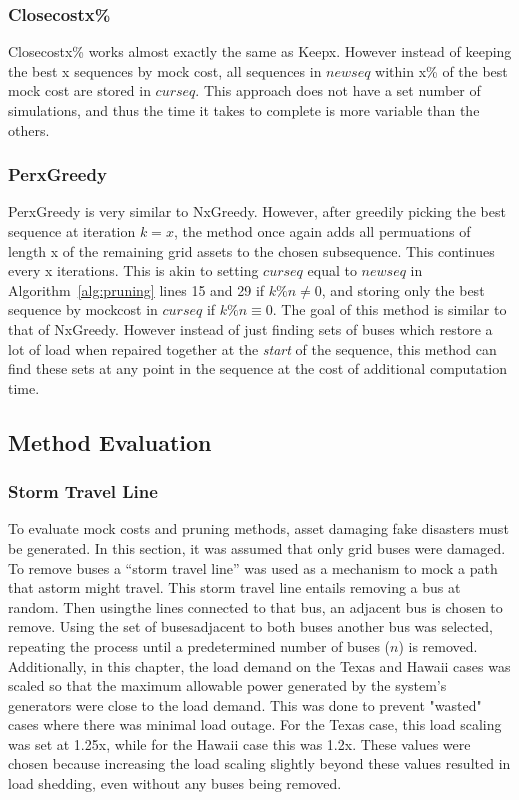 \documentclass[12pt]{article}
\begin{document}
\subsubsection{Closecostx\%}
Closecostx\% works almost exactly the same as Keepx. However instead of keeping the best x sequences by mock cost, all sequences in $newseq$ within x\% of the best mock cost are stored in $curseq$. This approach does not have a set number of simulations, and thus the time it takes to complete is more variable than the others.

\subsubsection{PerxGreedy}
PerxGreedy is very similar to NxGreedy. However, after greedily picking the best sequence at iteration $k=x$, the method once again adds all permuations of length x of the remaining grid assets to the chosen subsequence. This continues every x iterations. This is akin to setting $curseq$ equal to $newseq$ in Algorithm~\ref{alg:pruning} lines 15 and 29 if $k\%n \neq 0$, and storing only the best sequence by mockcost in $curseq$ if $k\%n \equiv 0$. The goal of this method is similar to that of NxGreedy. However instead of just finding sets of buses which restore a lot of load when repaired together at the \textit{start} of the sequence, this method can find these sets at any point in the sequence at the cost of additional computation time.

\subsection{Method Evaluation}
\subsubsection{Storm Travel Line}
To evaluate mock costs and pruning methods, asset damaging fake disasters must be generated. In this section, it was assumed that only grid buses were damaged. To remove buses a “storm travel line” was used as a mechanism to mock a path that astorm might travel. This storm travel line entails removing a bus at random. Then usingthe lines connected to that bus, an adjacent bus is chosen to remove. Using the set of busesadjacent to both buses another bus was selected, repeating the process until a predetermined number of buses ($n$) is removed. Additionally, in this chapter, the load demand on the Texas and Hawaii cases was scaled so that the maximum allowable power generated by the system's generators were close to the load demand. This was done to prevent "wasted" cases where there was minimal load outage. For the Texas case, this load scaling was set at 1.25x, while for the Hawaii case this was 1.2x. These values were chosen because increasing the load scaling slightly beyond these values resulted in load shedding, even without any buses being removed.
\end{document}
